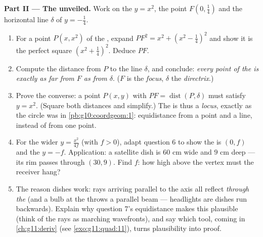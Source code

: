 \begin{problem}
\medskip
\noindent\textbf{Part II --- The  unveiled.}
Work on the  $y = x^2$, the point
$F\left(0, \frac14\right)$ and the horizontal line $\delta$ of
 $y = -\frac14$.
\begin{enumerate}[resume]
  \item For a point $P(x, x^2)$ of the , expand
        $PF^2 = x^2 + \left(x^2 - \frac14\right)^2$ and show it
        is the perfect square $\left(x^2 + \frac14\right)^2$.
        Deduce $PF$.
  \item Compute the distance from $P$ to the line $\delta$, and
        conclude: \emph{every point of the  is exactly
        as far from $F$ as from $\delta$}. ($F$ is the
        \emph{focus}, $\delta$ the
        \emph{directrix}.)
  \item Prove the converse: a point $P(x, y)$ with
        $PF = \operatorname{dist}(P, \delta)$ must satisfy
        $y = x^2$. (Square both distances and simplify.) The
         is thus a \emph{locus}, exactly as the circle
        was in \cref{pb:g10:coordgeom:1}: equidistance from a
        point and a line, instead of from one point.
  \item For the wider  $y = \frac{x^2}{4f}$ (with
        $f > 0$), adapt question 6 to show the  is
        $(0, f)$ and the  $y = -f$. Application: a
        satellite dish is $60$ cm wide and $9$ cm deep --- its
        rim passes through $(30, 9)$. Find $f$: how high above
        the vertex must the receiver hang?
  \item The reason dishes work: rays arriving parallel to the
        axis all reflect \emph{through the } (and a bulb at
        the  throws a parallel beam --- headlights are
        dishes run backwards). Explain why question 7's
        equidistance makes this plausible (think of the rays as
        marching wavefronts), and say which tool, coming in
        \cref{ch:g11:deriv} (see \cref{exo:g11:quad:11}), turns
        plausibility into proof.
\end{enumerate}


\end{problem}
